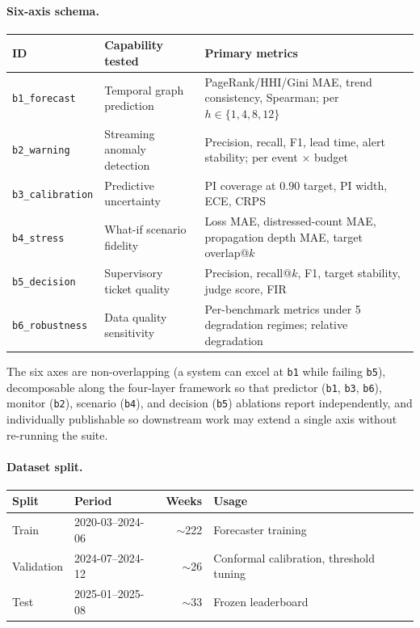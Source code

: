 \paragraph{Six-axis schema.}
\begin{center}\small
\begin{tabularx}{\linewidth}{@{}llX@{}}
\toprule
ID                       & Capability tested                & Primary metrics \\
\midrule
\texttt{b1\_forecast}    & Temporal graph prediction        & PageRank/HHI/Gini MAE, trend consistency, Spearman; per $h\!\in\!\{1,4,8,12\}$ \\
\texttt{b2\_warning}     & Streaming anomaly detection      & Precision, recall, F1, lead time, alert stability; per event $\times$ budget \\
\texttt{b3\_calibration} & Predictive uncertainty           & PI coverage at $0.90$ target, PI width, ECE, CRPS \\
\texttt{b4\_stress}      & What-if scenario fidelity        & Loss MAE, distressed-count MAE, propagation depth MAE, target overlap@$k$ \\
\texttt{b5\_decision}    & Supervisory ticket quality       & Precision, recall@$k$, F1, target stability, judge score, FIR \\
\texttt{b6\_robustness}  & Data quality sensitivity         & Per-benchmark metrics under 5 degradation regimes; relative degradation \\
\bottomrule
\end{tabularx}
\end{center}
The six axes are non-overlapping (a system can excel at \texttt{b1} while
failing \texttt{b5}), decomposable along the four-layer framework so that
predictor (\texttt{b1}, \texttt{b3}, \texttt{b6}), monitor (\texttt{b2}),
scenario (\texttt{b4}), and decision (\texttt{b5}) ablations report
independently, and individually publishable so downstream work may extend a
single axis without re-running the suite.

\paragraph{Dataset split.}
\begin{center}\small
\begin{tabularx}{\linewidth}{@{}llrX@{}}
\toprule
Split      & Period             & Weeks       & Usage \\
\midrule
Train      & 2020-03--2024-06   & $\sim$222   & Forecaster training \\
Validation & 2024-07--2024-12   & $\sim$26    & Conformal calibration, threshold tuning \\
Test       & 2025-01--2025-08   & $\sim$33    & Frozen leaderboard \\
\bottomrule
\end{tabularx}
\end{center}

